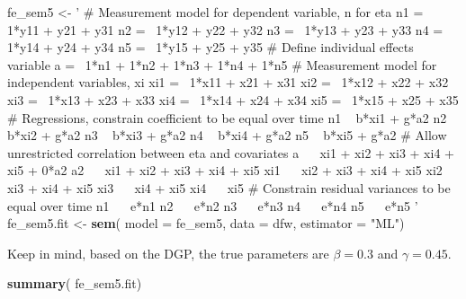 \documentclass[]{interact}
\theoremstyle{plain}%
\theoremstyle{definition}
\theoremstyle{remark}
\newenvironment{Shaded}{\begin{snugshade}}{\end{snugshade}}
\newcommand{\DataTypeTok}[1]{\textcolor[rgb]{0.13,0.29,0.53}{#1}}
\newcommand{\KeywordTok}[1]{\textcolor[rgb]{0.13,0.29,0.53}{\textbf{#1}}}
\newcommand{\NormalTok}[1]{#1}
\newcommand{\StringTok}[1]{\textcolor[rgb]{0.31,0.60,0.02}{#1}}
\begin{document}
\begin{Shaded}
\begin{Highlighting}[]
\NormalTok{fe_sem5 <-}\StringTok{ '}
\StringTok{# Measurement model for dependent variable, n for eta}
\StringTok{n1 =~ 1*y11 + y21 + y31}
\StringTok{n2 =~ 1*y12 + y22 + y32}
\StringTok{n3 =~ 1*y13 + y23 + y33}
\StringTok{n4 =~ 1*y14 + y24 + y34}
\StringTok{n5 =~ 1*y15 + y25 + y35}
\StringTok{# Define individual effects variable }
\StringTok{a =~ 1*n1 + 1*n2 + 1*n3 + 1*n4 + 1*n5}
\StringTok{# Measurement model for independent variables, xi }
\StringTok{xi1 =~ 1*x11 + x21 + x31 }
\StringTok{xi2 =~ 1*x12 + x22 + x32}
\StringTok{xi3 =~ 1*x13 + x23 + x33}
\StringTok{xi4 =~ 1*x14 + x24 + x34}
\StringTok{xi5 =~ 1*x15 + x25 + x35}
\StringTok{# Regressions, constrain coefficient to be equal over time}
\StringTok{n1 ~ b*xi1 + g*a2}
\StringTok{n2 ~ b*xi2 + g*a2}
\StringTok{n3 ~ b*xi3 + g*a2}
\StringTok{n4 ~ b*xi4 + g*a2}
\StringTok{n5 ~ b*xi5 + g*a2}
\StringTok{# Allow unrestricted correlation between eta and covariates}
\StringTok{a ~~ xi1 + xi2 + xi3 + xi4 + xi5 + 0*a2}
\StringTok{a2 ~~ xi1 + xi2 + xi3 + xi4 + xi5}
\StringTok{xi1 ~~ xi2 + xi3 + xi4 + xi5}
\StringTok{xi2 ~~ xi3 + xi4 + xi5}
\StringTok{xi3 ~~ xi4 + xi5}
\StringTok{xi4 ~~ xi5}
\StringTok{# Constrain residual variances to be equal over time}
\StringTok{n1 ~~ e*n1}
\StringTok{n2 ~~ e*n2}
\StringTok{n3 ~~ e*n3}
\StringTok{n4 ~~ e*n4}
\StringTok{n5 ~~ e*n5}
\StringTok{'}
\NormalTok{fe_sem5.fit <-}\StringTok{ }\KeywordTok{sem}\NormalTok{( }\DataTypeTok{model =}\NormalTok{ fe_sem5, }
                    \DataTypeTok{data =}\NormalTok{ dfw, }
                    \DataTypeTok{estimator =} \StringTok{"ML"}\NormalTok{)}
\end{Highlighting}
\end{Shaded}

\doublespacing

Keep in mind, based on the DGP, the true parameters are \(\beta = 0.3\)
and \(\gamma = 0.45\).

\singlespacing

\begin{Shaded}
\begin{Highlighting}[]
\KeywordTok{summary}\NormalTok{( fe_sem5.fit)}
\end{Highlighting}
\end{Shaded}
\end{document}
